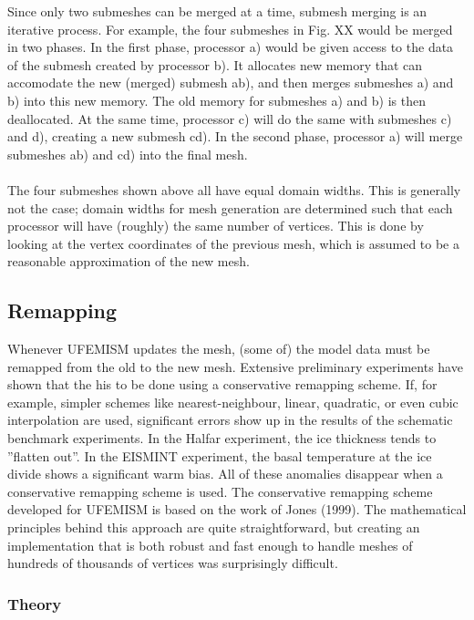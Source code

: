 \documentclass{article}
\begin{document}
Since only two submeshes can be merged at a time, submesh merging is an iterative process. For example, the four submeshes in Fig. XX would be merged in two phases. In the first phase, processor a) would be given access to the data of the submesh created by processor b). It allocates new memory that can accomodate the new (merged) submesh ab), and then merges submeshes a) and b) into this new memory. The old memory for submeshes a) and b) is then deallocated. At the same time, processor c) will do the same with submeshes c) and d), creating a new submesh cd). In the second phase, processor a) will merge submeshes ab) and cd) into the final mesh.\\
\\
The four submeshes shown above all have equal domain widths. This is generally not the case; domain widths for mesh generation are determined such that each processor will have (roughly) the same number of vertices. This is done by looking at the vertex coordinates of the previous mesh, which is assumed to be a reasonable approximation of the new mesh.

\newpage
\subsection{Remapping}

Whenever UFEMISM updates the mesh, (some of) the model data must be remapped from the old to the new mesh. Extensive preliminary experiments have shown that the his to be done using a conservative remapping scheme. If, for example, simpler schemes like nearest-neighbour, linear, quadratic, or even cubic interpolation are used, significant errors show up in the results of the schematic benchmark experiments. In the Halfar experiment, the ice thickness tends to ”flatten out”. In the EISMINT experiment, the basal temperature at the ice divide shows a significant warm bias. All of these anomalies disappear when a conservative remapping scheme is used. The conservative remapping scheme developed for UFEMISM is based on the work of Jones (1999). The mathematical principles behind this approach are quite straightforward, but creating an implementation that is both robust and fast enough to handle meshes of hundreds of thousands of vertices was surprisingly difficult.

\subsubsection{Theory}
\end{document}
